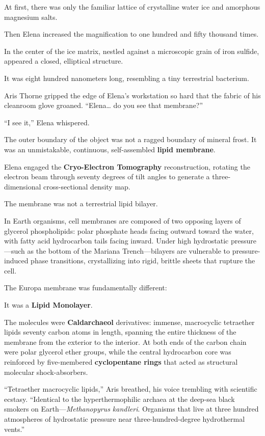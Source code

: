 \documentclass[12pt,twoside,openright]{book}
\begin{document}
At first, there was only the familiar lattice of crystalline water ice
and amorphous magnesium salts.

Then Elena increased the magnification to one hundred and fifty thousand
times.

In the center of the ice matrix, nestled against a microscopic grain of
iron sulfide, appeared a closed, elliptical structure.

It was eight hundred nanometers long, resembling a tiny terrestrial
bacterium.

Aris Thorne gripped the edge of Elena's workstation so hard that the
fabric of his cleanroom glove groaned. ``Elena\ldots{} do you see that
membrane?''

``I see it,'' Elena whispered.

The outer boundary of the object was not a ragged boundary of mineral
frost. It was an unmistakable, continuous, self-assembled \textbf{lipid
membrane}.

Elena engaged the \textbf{Cryo-Electron Tomography} reconstruction,
rotating the electron beam through seventy degrees of tilt angles to
generate a three-dimensional cross-sectional density map.

The membrane was not a terrestrial lipid bilayer.

In Earth organisms, cell membranes are composed of two opposing layers
of glycerol phospholipids: polar phosphate heads facing outward toward
the water, with fatty acid hydrocarbon tails facing inward. Under high
hydrostatic pressure---such as the bottom of the Mariana
Trench---bilayers are vulnerable to pressure-induced phase transitions,
crystallizing into rigid, brittle sheets that rupture the cell.

The Europa membrane was fundamentally different:

It was a \textbf{Lipid Monolayer}.

The molecules were \textbf{Caldarchaeol} derivatives: immense,
macrocyclic tetraether lipids seventy carbon atoms in length, spanning
the entire thickness of the membrane from the exterior to the interior.
At both ends of the carbon chain were polar glycerol ether groups, while
the central hydrocarbon core was reinforced by five-membered
\textbf{cyclopentane rings} that acted as structural molecular
shock-absorbers.

``Tetraether macrocyclic lipids,'' Aris breathed, his voice trembling
with scientific ecstasy. ``Identical to the hyperthermophilic archaea at
the deep-sea black smokers on Earth---\emph{Methanopyrus kandleri}.
Organisms that live at three hundred atmospheres of hydrostatic pressure
near three-hundred-degree hydrothermal vents.''
\end{document}
